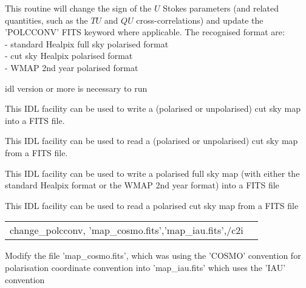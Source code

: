 \begin{codedescription}
{This routine will change the sign of the $U$ Stokes parameters (and related
quantities, such as the $TU$ and $QU$ cross-correlations) and update the
'POLCCONV' FITS keyword where applicable.
The recognised format are: \\
- standard Healpix  full sky polarised format \\
- cut sky Healpix polarised format \\
- WMAP 2nd year polarised format}
\end{codedescription}



\begin{related}
  \begin{sulist}{} %
  \item[idl] version \idlversion or more is necessary to run \facname
  \item[\htmlref{write\_fits\_cut4}{idl:write_fits_cut4}] This \healpix IDL
  facility can be used to write a (polarised or unpolarised) cut sky map into a
  FITS file.
  \item[\htmlref{read\_fits\_cut4}{idl:read_fits_cut4}] This \healpix IDL
  facility can be used to read a (polarised or unpolarised) cut sky map from a
  FITS file.
  \item[\htmlref{write\_tqu}{idl:write_tqu}] This \healpix IDL
  facility can be used to write a polarised full sky map (with either the
  standard Healpix format or the WMAP 2nd year format) into a
  FITS file
  \item[\htmlref{read\_tqu}{idl:read_tqu}] This \healpix IDL
  facility can be used to read a polarised cut sky map from a
  FITS file
  \end{sulist}
\end{related}


\begin{example}
{
\begin{tabular}{ll} %
change\_polcconv, 'map\_cosmo.fits','map\_iau.fits',/c2i
\end{tabular}
}
{ Modify the file 'map\_cosmo.fits', which was using the 'COSMO' convention for
  polarisation coordinate convention into 'map\_iau.fits' which uses the 'IAU' convention
}
\end{example}


